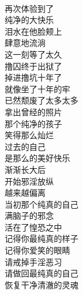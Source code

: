 \begin{poem}[记得你最纯真的样子]
    \begin{multicols}{2}
        \begin{center}~\\
            再次体验到了 \\ 纯净的大快乐 \\ 泪水在他脸颊上 \\ 肆意地流淌 \\ 这一刻等了太久 \\ 撸囚终于出狱了 \\ 掉进撸坑十年了 \\ 就像坐了十年的牢 \\ 已然颓废了太多太多 \\ 拿出曾经的照片 \\ 那个纯净的孩子 \\ 笑得那么灿烂 \\ 过去的自己 \\ 是那么的美好快乐 \\ 渐渐长大后 \\ 开始邪淫放纵 \\ 越来越偏离 \\ 当初那个纯真的自己 \\ 满脑子的邪念 \\ 活在了惶恐之中 \\ 记得你最纯真的样子 \\ 记得你爱笑的眼睛 \\ 请戒掉手淫恶习 \\ 请做回最纯真的自己 \\ 恢复干净清澈的灵魂
        \end{center}
    \end{multicols}
\end{poem}

